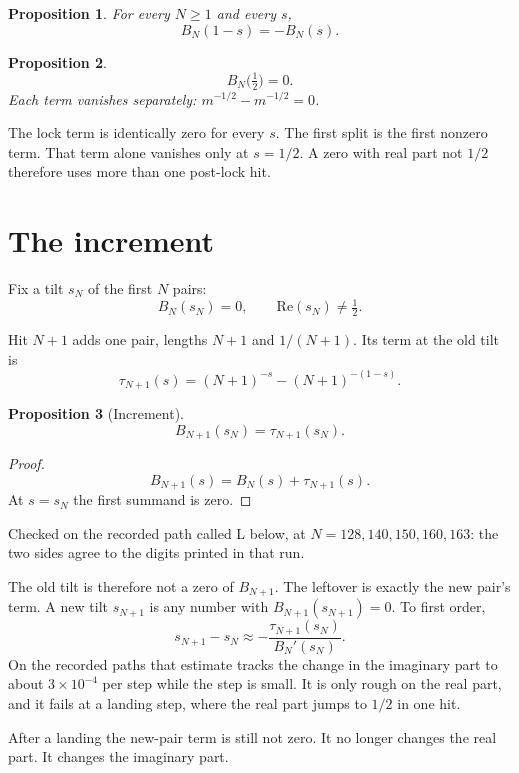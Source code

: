 \documentclass[10pt,a4paper]{article}
\theoremstyle{plain}
\newtheorem{proposition}{Proposition}
\theoremstyle{definition}
\theoremstyle{remark}
\begin{document}
\begin{proposition}
For every \(N\ge 1\) and every \(s\),
\[
B_N(1-s)=-B_N(s).
\]
\end{proposition}

\begin{proposition}
\[
B_N\bigl(\tfrac12\bigr)=0.
\]
Each term vanishes separately: \(m^{-1/2}-m^{-1/2}=0\).
\end{proposition}

The lock term is identically zero for every \(s\).
The first split is the first nonzero term.
That term alone vanishes only at \(s=1/2\).
A zero with real part not \(1/2\) therefore uses more than one post-lock hit.

\section{The increment}

Fix a tilt \(s_N\) of the first \(N\) pairs:
\[
B_N(s_N)=0,\qquad \mathrm{Re}(s_N)\ne\tfrac12.
\]

Hit \(N+1\) adds one pair, lengths \(N+1\) and \(1/(N+1)\).
Its term at the old tilt is
\[
\tau_{N+1}(s)=(N+1)^{-s}-(N+1)^{-(1-s)}.
\]

\begin{proposition}[Increment]
\[
B_{N+1}(s_N)=\tau_{N+1}(s_N).
\]
\end{proposition}

\begin{proof}
\[
B_{N+1}(s)=B_N(s)+\tau_{N+1}(s).
\]
At \(s=s_N\) the first summand is zero.
\end{proof}

Checked on the recorded path called L below, at \(N=128,140,150,160,163\): the two sides agree to the digits printed in that run.

The old tilt is therefore not a zero of \(B_{N+1}\).
The leftover is exactly the new pair’s term.
A new tilt \(s_{N+1}\) is any number with \(B_{N+1}(s_{N+1})=0\).
To first order,
\[
s_{N+1}-s_N\approx -\frac{\tau_{N+1}(s_N)}{B_N'(s_N)}.
\]
On the recorded paths that estimate tracks the change in the imaginary part to about \(3\times 10^{-4}\) per step while the step is small.
It is only rough on the real part, and it fails at a landing step, where the real part jumps to \(1/2\) in one hit.

After a landing the new-pair term is still not zero.
It no longer changes the real part.
It changes the imaginary part.
\end{document}
